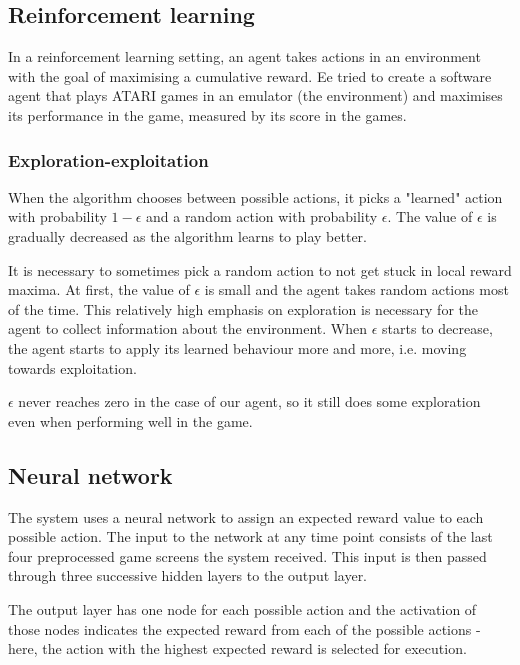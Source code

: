 \documentclass[a4paper,12pt]{article}
\begin{document}
\subsection{Reinforcement learning}
In a reinforcement learning setting, an agent takes actions in an environment with the goal of maximising a cumulative reward. Ee tried to create a software agent that plays ATARI games in an emulator (the environment) and maximises its performance in the game, measured by its score in the games.

\subsubsection{Exploration-exploitation}
When the algorithm chooses between possible actions, it picks a "learned" action with probability $1-\epsilon$ and a random action with probability $\epsilon$. The value of $\epsilon$ is gradually decreased as the algorithm learns to play better.

It is necessary to sometimes pick a random action to not get stuck in local reward maxima. At first, the value of $\epsilon$ is small and the agent takes random actions most of the time. This relatively high emphasis on exploration is necessary for the agent to collect information about the environment. When $\epsilon$ starts to decrease, the agent starts to apply its learned behaviour more and more, i.e. moving towards exploitation.

$\epsilon$ never reaches zero in the case of our agent, so it still does some exploration even when performing well in the game.

\subsection{Neural network}
The system uses a neural network to assign an expected reward value to each possible action. The input to the network at any time point consists of the last four preprocessed game screens the system received. This input is then passed through three successive hidden layers to the output layer. 

The output layer has one node for each possible action and the activation of those nodes indicates the expected reward from each of the possible actions - here, the action with the highest expected reward is selected for execution.
\end{document}

